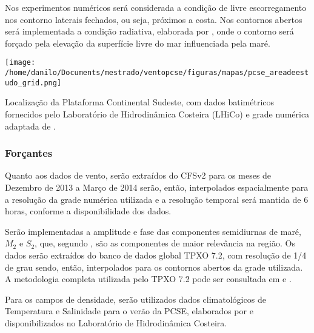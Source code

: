 \hspace{6mm} Nos experimentos numéricos será considerada a condição de livre escorregamento 
nos contorno laterais fechados, ou seja, próximos a costa. Nos contornos abertos será implementada
a condição radiativa, elaborada por , onde o contorno será forçado
pela elevação da superfície livre do mar influenciada pela maré.

\bigskip
\begin{figurehere}
  \centerline{\hbox{\texttt{[image: /home/danilo/Documents/mestrado/ventopcse/figuras/mapas/pcse\_areadeestudo\_grid.png]}}}
  \vspace{-.1in}
  \caption{Localização da Plataforma Continental Sudeste, com dados batimétricos fornecidos pelo Laboratório de
  Hidrodinâmica Costeira (LHiCo) e grade numérica adaptada de \protect {}.}
\label{fig:pcse_areaestudo}
\end{figurehere}
\bigskip
\bigskip

\subsubsection{Forçantes} %
\label{sub:forcantes}


\hspace{6mm} Quanto aos dados de vento, serão extraídos do CFSv2 para os meses de Dezembro de 2013 
a Março de 2014 serão, então, interpolados espacialmente para a resolução da grade numérica utilizada
 e a resolução temporal será mantida de 6 horas, conforme a disponibilidade dos dados.

\hspace{6mm} Serão implementadas a amplitude e fase das componentes semidiurnas de maré,
$M_2$ e $S_2$, que, segundo , são as componentes de maior
relevância na região. Os dados serão extraídos do banco de dados global TPXO 7.2, com 
resolução de 1/4 de grau sendo, então, interpolados para os contornos abertos da grade utilizada. 
A metodologia completa utilizada pelo TPXO 7.2 pode ser consultada em  
e .

\hspace{6mm} Para os campos de densidade, serão utilizados dados climatológicos de Temperatura
e Salinidade para o verão da PCSE, elaborados por  e disponibilizados no 
Laboratório de Hidrodinâmica Costeira.

